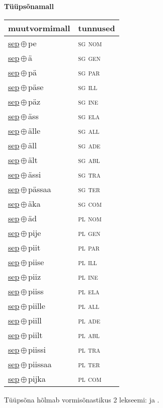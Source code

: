 

\vspace{3.5em}
\noindent \begin{minipage}{\textwidth}
\noindent \textbf{Tüüpsõnamall \,}\\

\begin{sideways}
\begin{tabular}{l l}
muutvormimall & tunnused \\
\hline
\underline{sep}\,$\oplus$\,pe & \textsc{ sg nom } \\
\underline{sep}\,$\oplus$\,ä & \textsc{ sg gen } \\
\underline{sep}\,$\oplus$\,pä & \textsc{ sg par } \\
\underline{sep}\,$\oplus$\,päse & \textsc{ sg ill } \\
\underline{sep}\,$\oplus$\,päz & \textsc{ sg ine } \\
\underline{sep}\,$\oplus$\,äss & \textsc{ sg ela } \\
\underline{sep}\,$\oplus$\,älle & \textsc{ sg all } \\
\underline{sep}\,$\oplus$\,äll & \textsc{ sg ade } \\
\underline{sep}\,$\oplus$\,ält & \textsc{ sg abl } \\
\underline{sep}\,$\oplus$\,ässi & \textsc{ sg tra } \\
\underline{sep}\,$\oplus$\,pässaa & \textsc{ sg ter } \\
\underline{sep}\,$\oplus$\,äka & \textsc{ sg com } \\
\underline{sep}\,$\oplus$\,äd & \textsc{ pl nom } \\
\underline{sep}\,$\oplus$\,pije & \textsc{ pl gen } \\
\underline{sep}\,$\oplus$\,piit & \textsc{ pl par } \\
\underline{sep}\,$\oplus$\,piise & \textsc{ pl ill } \\
\underline{sep}\,$\oplus$\,piiz & \textsc{ pl ine } \\
\underline{sep}\,$\oplus$\,piiss & \textsc{ pl ela } \\
\underline{sep}\,$\oplus$\,piille & \textsc{ pl all } \\
\underline{sep}\,$\oplus$\,piill & \textsc{ pl ade } \\
\underline{sep}\,$\oplus$\,piilt & \textsc{ pl abl } \\
\underline{sep}\,$\oplus$\,piissi & \textsc{ pl tra } \\
\underline{sep}\,$\oplus$\,piissaa & \textsc{ pl ter } \\
\underline{sep}\,$\oplus$\,pijka & \textsc{ pl com } \\
\end{tabular}
\end{sideways}
\label{tab:tüüpsõnamall-seppe}

\end{minipage}

 
\vspace{1em}
\noindent Tüüpsõna hõlmab vormisõnastikus 2 lekseemi:  ja .
